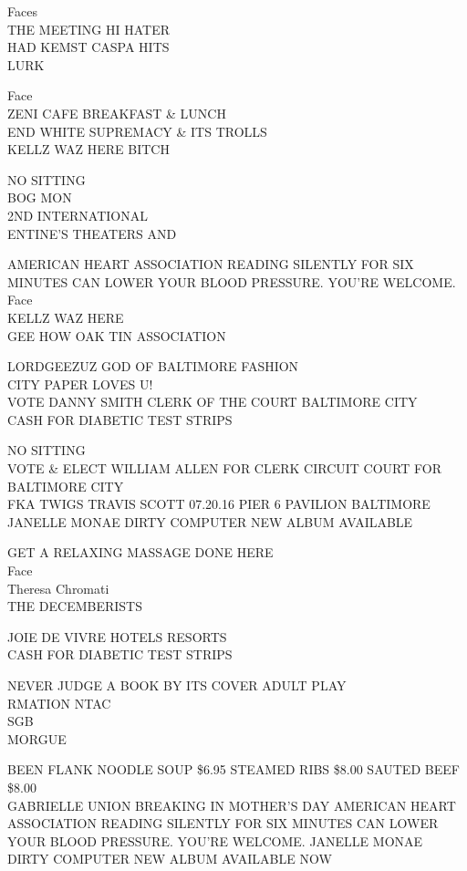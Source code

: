 \documentclass[10pt,letterpaper]{article}
\begin{document}
Faces\\
THE MEETING HI HATER\\
HAD KEMST CASPA HITS\\
LURK

Face\\
ZENI CAFE BREAKFAST \& LUNCH\\
END WHITE SUPREMACY \& ITS TROLLS\\
KELLZ WAZ HERE BITCH

NO SITTING\\
BOG MON\\
2ND INTERNATIONAL\\
ENTINE'S THEATERS AND

AMERICAN HEART ASSOCIATION READING SILENTLY FOR SIX MINUTES CAN LOWER YOUR BLOOD PRESSURE.  YOU'RE WELCOME.\\
Face\\
KELLZ WAZ HERE\\
GEE HOW OAK TIN ASSOCIATION

LORDGEEZUZ GOD OF BALTIMORE FASHION\\
CITY PAPER LOVES U!\\
VOTE DANNY SMITH CLERK OF THE COURT BALTIMORE CITY\\
CASH FOR DIABETIC TEST STRIPS

NO SITTING\\
VOTE \& ELECT WILLIAM ALLEN FOR CLERK CIRCUIT COURT FOR BALTIMORE CITY\\
FKA TWIGS TRAVIS SCOTT 07.20.16 PIER 6 PAVILION BALTIMORE\\
JANELLE MONAE DIRTY COMPUTER NEW ALBUM AVAILABLE

GET A RELAXING MASSAGE DONE HERE\\
Face\\
Theresa Chromati\\
THE DECEMBERISTS

JOIE DE VIVRE HOTELS RESORTS\\
CASH FOR DIABETIC TEST STRIPS

NEVER JUDGE A BOOK BY ITS COVER ADULT PLAY\\
RMATION NTAC\\
SGB\\
MORGUE

BEEN FLANK NOODLE SOUP \$6.95 STEAMED RIBS \$8.00 SAUTED BEEF \$8.00\\
GABRIELLE UNION BREAKING IN MOTHER'S DAY AMERICAN HEART ASSOCIATION READING SILENTLY FOR SIX MINUTES CAN LOWER YOUR BLOOD PRESSURE.  YOU'RE WELCOME. JANELLE MONAE DIRTY COMPUTER NEW ALBUM AVAILABLE NOW
\end{document}
